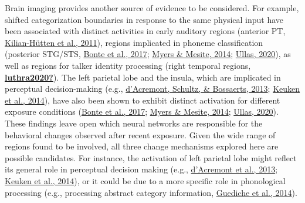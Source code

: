 \documentclass[
  11pt,
  man,floatsintext]{apa6}
\begin{document}
Brain imaging provides another source of evidence to be considered. For example, shifted categorization boundaries in response to the same physical input have been associated with distinct activities in early auditory regions (anterior PT, \protect\hyperlink{ref-kilianhutten2011}{Kilian-Hütten et al., 2011}), regions implicated in phoneme classification (posterior STG/STS, \protect\hyperlink{ref-bonte2017}{Bonte et al., 2017}; \protect\hyperlink{ref-myers-mesite2014}{Myers \& Mesite, 2014}; \protect\hyperlink{ref-ullas2020}{Ullas, 2020}), as well as regions for talker identity processing (right temporal regions, \protect\hyperlink{ref-luthra2020}{\textbf{luthra2020?}}). The left parietal lobe and the insula, which are implicated in perceptual decision-making (e.g., \protect\hyperlink{ref-dacremont2013}{d'Acremont, Schultz, \& Bossaerts, 2013}; \protect\hyperlink{ref-keuken2014}{Keuken et al., 2014}), have also been shown to exhibit distinct activation for different exposure conditions (\protect\hyperlink{ref-bonte2017}{Bonte et al., 2017}; \protect\hyperlink{ref-myers-mesite2014}{Myers \& Mesite, 2014}; \protect\hyperlink{ref-ullas2020}{Ullas, 2020}). These findings leave open which neural networks are responsible for the behavioral changes observed after recent exposure. Given the wide range of regions found to be involved, all three change mechanisms explored here are possible candidates. For instance, the activation of left parietal lobe might reflect its general role in perceptual decision making (e.g., \protect\hyperlink{ref-dacremont2013}{d'Acremont et al., 2013}; \protect\hyperlink{ref-keuken2014}{Keuken et al., 2014}), or it could be due to a more specific role in phonological processing (e.g., processing abstract category information, \protect\hyperlink{ref-guediche2014}{Guediche et al., 2014}).
\end{document}
